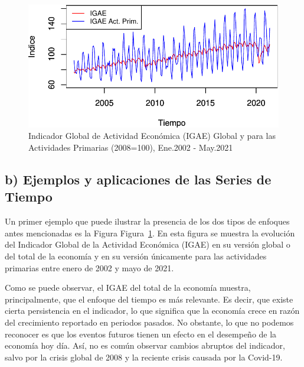 \documentclass[
  a4paper,
]{article}
\begin{document}
\begin{figure}[H]

\caption{\label{fig-fig1}Indicador Global de Actividad Económica (IGAE)
Global y para las Actividades Primarias (2008=100), Ene.2002 - May.2021}

{\centering \includegraphics{index_files/figure-pdf/fig-fig1-1.pdf}

}

\end{figure}

\hypertarget{b-ejemplos-y-aplicaciones-de-las-series-de-tiempo}{%
\subsection{b) Ejemplos y aplicaciones de las Series de
Tiempo}\label{b-ejemplos-y-aplicaciones-de-las-series-de-tiempo}}

Un primer ejemplo que puede ilustrar la presencia de los dos tipos de
enfoques antes mencionadas es la Figura Figura~\ref{fig-fig1}. En esta
figura se muestra la evolución del Indicador Global de la Actividad
Económica (IGAE) en su versión global o del total de la economía y en su
versión únicamente para las actividades primarias entre enero de 2002 y
mayo de 2021.

Como se puede observar, el IGAE del total de la economía muestra,
principalmente, que el enfoque del tiempo es más relevante. Es decir,
que existe cierta persistencia en el indicador, lo que significa que la
economía crece en razón del crecimiento reportado en periodos pasados.
No obstante, lo que no podemos reconocer es que los eventos futuros
tienen un efecto en el desempeño de la economía hoy día. Así, no es
común observar cambios abruptos del indicador, salvo por la crisis
global de 2008 y la reciente crisis causada por la Covid-19.
\end{document}
